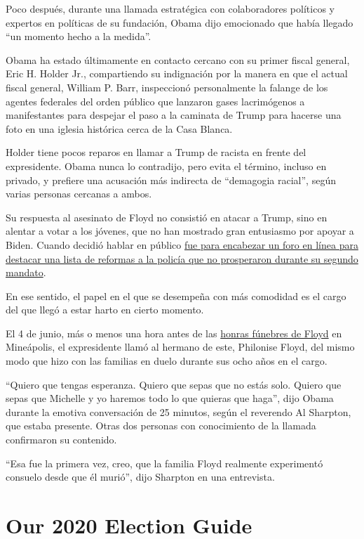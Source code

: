 Poco después, durante una llamada estratégica con colaboradores
políticos y expertos en políticas de su fundación, Obama dijo emocionado
que había llegado ``un momento hecho a la medida''.

Obama ha estado últimamente en contacto cercano con su primer fiscal
general, Eric H. Holder Jr., compartiendo su indignación por la manera
en que el actual fiscal general, William P. Barr, inspeccionó
personalmente la falange de los agentes federales del orden público que
lanzaron gases lacrimógenos a manifestantes para despejar el paso a la
caminata de Trump para hacerse una foto en una iglesia histórica cerca
de la Casa Blanca.

Holder tiene pocos reparos en llamar a Trump de racista en frente del
expresidente. Obama nunca lo contradijo, pero evita el término, incluso
en privado, y prefiere una acusación más indirecta de ``demagogia
racial'', según varias personas cercanas a ambos.

Su respuesta al asesinato de Floyd no consistió en atacar a Trump, sino
en alentar a votar a los jóvenes, que no han mostrado gran entusiasmo
por apoyar a Biden. Cuando decidió hablar en público
\href{https://www.nytimes.com/2020/06/23/us/politics/obama-biden-fundraiser.html}{fue
para encabezar un foro en línea para destacar una lista de reformas a la
policía que no prosperaron durante su segundo mandato}.

En ese sentido, el papel en el que se desempeña con más comodidad es el
cargo del que llegó a estar harto en cierto momento.

El 4 de junio, más o menos una hora antes de las
\href{https://www.nytimes.com/2020/06/04/us/floyd-memorial-funeral.html}{honras
fúnebres de Floyd} en Mineápolis, el expresidente llamó al hermano de
este, Philonise Floyd, del mismo modo que hizo con las familias en duelo
durante sus ocho años en el cargo.

``Quiero que tengas esperanza. Quiero que sepas que no estás solo.
Quiero que sepas que Michelle y yo haremos todo lo que quieras que
haga'', dijo Obama durante la emotiva conversación de 25 minutos, según
el reverendo Al Sharpton, que estaba presente. Otras dos personas con
conocimiento de la llamada confirmaron su contenido.

``Esa fue la primera vez, creo, que la familia Floyd realmente
experimentó consuelo desde que él murió'', dijo Sharpton en una
entrevista.

\hypertarget{our-2020-election-guide}{%
\section{Our 2020 Election Guide}\label{our-2020-election-guide}}


